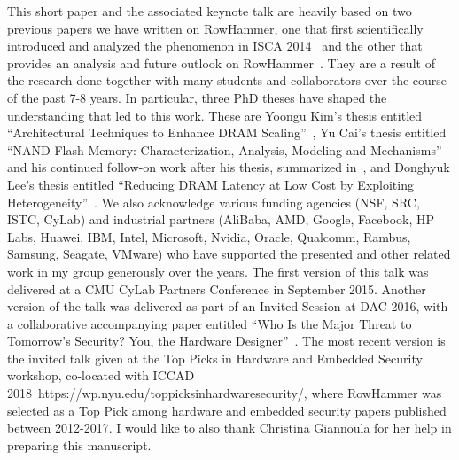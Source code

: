 \documentclass[runningheads]{llncs}
\begin{document}
This short paper and the associated keynote talk are heavily based on
two previous papers we have written on RowHammer, one that first
scientifically introduced and analyzed the phenomenon in ISCA 2014~\cite{rowhammer-isca2014} and
the other that provides an analysis and future outlook on
RowHammer~\cite{onur-date17}. They are a result of the research done
together with many students and collaborators over the course of the
past 7-8 years. In particular, three PhD theses have shaped the
understanding that led to this work. These are Yoongu Kim's thesis
entitled ``Architectural Techniques to Enhance DRAM
Scaling''~\cite{yoongu-thesis}, Yu Cai's thesis entitled ``NAND Flash
Memory: Characterization, Analysis, Modeling and
Mechanisms''~\cite{yucai-thesis} and his continued follow-on work
after his thesis, summarized in~\cite{cai2017errors,cai2017error}, and
Donghyuk Lee's thesis entitled ``Reducing DRAM Latency at Low Cost by
Exploiting Heterogeneity''~\cite{donghyuk-thesis-arxiv16}. We also
acknowledge various funding agencies (NSF, SRC, ISTC, CyLab) and
industrial partners (AliBaba, AMD, Google, Facebook, HP Labs, Huawei,
IBM, Intel, Microsoft, Nvidia, Oracle, Qualcomm, Rambus, Samsung,
Seagate, VMware) who have supported the presented and other related
work in my group generously over the years. The first version of this
talk was delivered at a CMU CyLab Partners Conference in September
2015. Another version of the talk was delivered as part of an Invited
Session at DAC 2016, with a collaborative accompanying paper entitled
``Who Is the Major Threat to Tomorrow’s Security? You, the Hardware
Designer''~\cite{dac-invited-paper16}. The most recent version is the
invited talk given at the Top Picks in Hardware and Embedded Security
workshop, co-located with ICCAD 2018~https://wp.nyu.edu/toppicksinhardwaresecurity/,
where RowHammer was selected as a Top Pick among hardware and embedded
security papers published between 2012-2017. I would like to also
thank Christina Giannoula for her help in preparing this manuscript.







\end{document}
